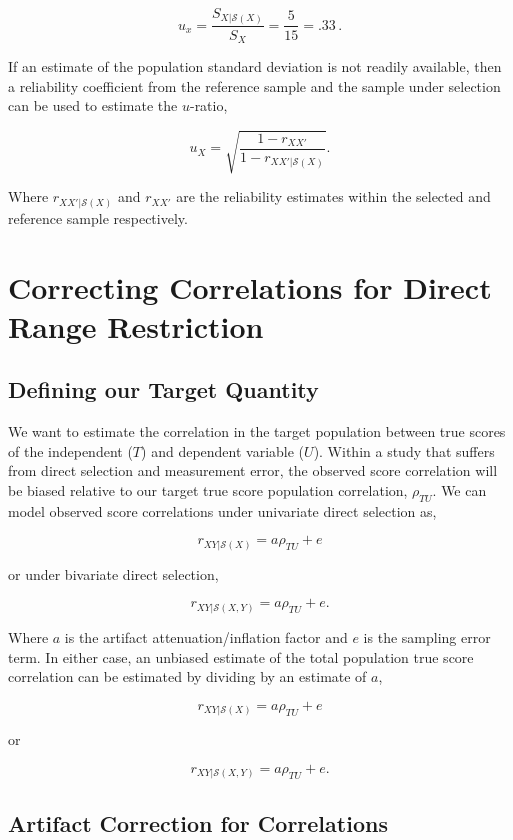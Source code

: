 \documentclass[
  letterpaper,
  DIV=11,
  numbers=noendperiod]{scrreprt}
\begin{document}
\[
u_x = \frac{S_{X|\mathcal{S}(X)}}{S_X} = \frac{5}{15}= .33\, .
\]

If an estimate of the population standard deviation is not readily
available, then a reliability coefficient from the reference sample and
the sample under selection can be used to estimate the \(u\)-ratio,

\[
u_X = \sqrt{\frac{1-r_{XX'}}{1-r_{XX'|\mathcal{S}(X)}}}.
\]

Where \(r_{XX'|\mathcal{S}(X)}\) and \(r_{XX'}\) are the reliability
estimates within the selected and reference sample respectively.

\section{Correcting Correlations for Direct Range
Restriction}\label{correcting-correlations-for-direct-range-restriction}

\subsection{Defining our Target
Quantity}\label{defining-our-target-quantity-4}

We want to estimate the correlation in the target population between
true scores of the independent (\(T\)) and dependent variable (\(U\)).
Within a study that suffers from direct selection and measurement error,
the observed score correlation will be biased relative to our target
true score population correlation, \(\rho_{TU}\). We can model observed
score correlations under univariate direct selection as,

\[
r_{XY|\mathcal{S}(X)} = a \rho_{TU} + e
\]

or under bivariate direct selection,

\[
r_{XY|\mathcal{S}(X,Y)} = a \rho_{TU} + e.
\]

Where \(a\) is the artifact attenuation/inflation factor and \(e\) is
the sampling error term. In either case, an unbiased estimate of the
total population true score correlation can be estimated by dividing by
an estimate of \(a\),

\[
r_{XY|\mathcal{S}(X)} = a \rho_{TU} + e
\]

or

\[
r_{XY|\mathcal{S}(X,Y)} = a \rho_{TU} + e.
\]

\subsection{Artifact Correction for Correlations}\label{sec-corr-DDR}
\end{document}
